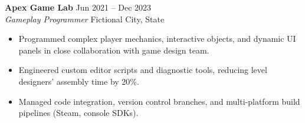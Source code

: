 \documentclass[10pt]{article}
\begin{document}
\begin{minipage}[t]{0.62\textwidth}
    \vspace{6pt}
    
    \textbf{Apex Game Lab} \hfill \textcolor{textlight}{\small Jun 2021 -- Dec 2023} \\
    \textit{Gameplay Programmer} \hfill \textcolor{accent}{\small Fictional City, State}
    \begin{itemize}
        \item Programmed complex player mechanics, interactive objects, and dynamic UI panels in close collaboration with game design team.
        \item Engineered custom editor scripts and diagnostic tools, reducing level designers' assembly time by 20\%.
        \item Managed code integration, version control branches, and multi-platform build pipelines (Steam, console SDKs).
    \end{itemize}
\end{minipage}%
\hfill%
\end{document}
